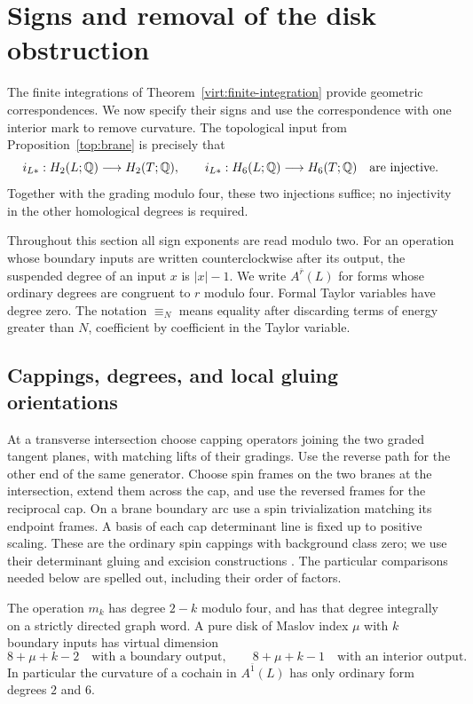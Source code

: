 \section{Signs and removal of the disk obstruction}
\label{obs:section}

The finite integrations of Theorem~\ref{virt:finite-integration} provide
geometric correspondences.  We now specify their signs and use the
correspondence with one interior mark to remove curvature.  The topological
input from Proposition~\ref{top:brane} is precisely that
\begin{equation}
 \label{obs:topological-input}
 i_{L*}:H_2(L;\mathbb Q)\longrightarrow H_2(T;\mathbb Q),\qquad
 i_{L*}:H_6(L;\mathbb Q)\longrightarrow H_6(T;\mathbb Q)
 \quad\text{are injective}.
\end{equation}
Together with the grading modulo four, these two injections suffice; no
injectivity in the other homological degrees is required.

Throughout this section all sign exponents are read modulo two.  For an
operation whose boundary inputs are written counterclockwise after its
output, the suspended degree of an input $x$ is $|x|-1$.  We write
$A^{\bar r}(L)$ for forms whose ordinary degrees are congruent to $r$
modulo four.  Formal Taylor variables have degree zero.  The notation
$\equiv_N$ means equality after discarding terms of energy greater than
$N$, coefficient by coefficient in the Taylor variable.

\subsection{Cappings, degrees, and local gluing orientations}

At a transverse intersection choose capping operators joining the two
graded tangent planes, with matching lifts of their gradings.  Use the
reverse path for the other end of the same generator.  Choose spin frames
on the two branes at the intersection, extend them across the cap, and
use the reversed frames for the reciprocal cap.  On a brane boundary arc
use a spin trivialization matching its endpoint frames.  A basis of each
cap determinant line is fixed up to positive scaling.  These are the
ordinary spin cappings with background class zero; we use their
determinant gluing and excision constructions
\cite[Section~5]{akaho-joyce}.  The particular comparisons needed below are
spelled out, including their order of factors.

\begin{lemma}[Degrees]\label{obs:degree}
The operation $m_k$ has degree $2-k$ modulo four, and has that degree
integrally on a strictly directed graph word.  A pure disk of Maslov
index $\mu$ with $k$ boundary inputs has virtual dimension
\[
 8+\mu+k-2
 \quad\text{with a boundary output},\qquad
 8+\mu+k-1
 \quad\text{with an interior output}.
\]
In particular the curvature of a cochain in $A^{\bar1}(L)$ has only
ordinary form degrees $2$ and $6$.
\end{lemma}

